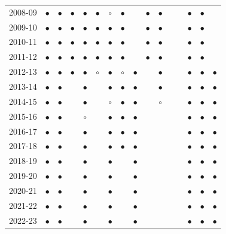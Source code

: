 \begin{table}[htbp]
\begin{tabular}{lccccccccccccccc}
2008-09 & $\bullet$ & $\bullet$ & $\bullet$ & $\bullet$ & $\bullet$ & $\circ$ & $\bullet$ &  & $\bullet$ & $\bullet$ &  &  & $\bullet$ & $\bullet$ &  \\
2009-10 & $\bullet$ & $\bullet$ & $\bullet$ & $\bullet$ & $\bullet$ & $\bullet$ & $\bullet$ &  & $\bullet$ & $\bullet$ &  &  & $\bullet$ & $\bullet$ &  \\
2010-11 & $\bullet$ & $\bullet$ & $\bullet$ & $\bullet$ & $\bullet$ & $\bullet$ & $\bullet$ &  & $\bullet$ & $\bullet$ &  &  & $\bullet$ & $\bullet$ &  \\
2011-12 & $\bullet$ & $\bullet$ & $\bullet$ & $\bullet$ & $\bullet$ & $\bullet$ & $\bullet$ &  & $\bullet$ & $\bullet$ &  &  & $\bullet$ & $\bullet$ &  \\
2012-13 & $\bullet$ & $\bullet$ & $\bullet$ & $\bullet$ & $\circ$ & $\bullet$ & $\circ$ & $\bullet$ &  & $\bullet$ &  &  & $\bullet$ & $\bullet$ & $\bullet$ \\
2013-14 & $\bullet$ & $\bullet$ &  & $\bullet$ &  & $\bullet$ & $\bullet$ & $\bullet$ &  & $\bullet$ &  &  & $\bullet$ & $\bullet$ & $\bullet$ \\
2014-15 & $\bullet$ & $\bullet$ &  & $\bullet$ &  & $\circ$ & $\bullet$ & $\bullet$ &  & $\circ$ &  &  & $\bullet$ & $\bullet$ & $\bullet$ \\
2015-16 & $\bullet$ & $\bullet$ &  & $\circ$ &  & $\bullet$ & $\bullet$ & $\bullet$ &  &  &  &  & $\bullet$ & $\bullet$ & $\bullet$ \\
2016-17 & $\bullet$ & $\bullet$ &  & $\bullet$ &  & $\bullet$ & $\bullet$ & $\bullet$ &  &  &  &  & $\bullet$ & $\bullet$ & $\bullet$ \\
2017-18 & $\bullet$ & $\bullet$ &  & $\bullet$ &  & $\bullet$ & $\bullet$ & $\bullet$ &  &  &  &  & $\bullet$ & $\bullet$ & $\bullet$ \\
2018-19 & $\bullet$ & $\bullet$ &  & $\bullet$ &  & $\bullet$ &  & $\bullet$ &  &  &  &  & $\bullet$ & $\bullet$ & $\bullet$ \\
2019-20 & $\bullet$ & $\bullet$ &  & $\bullet$ &  & $\bullet$ &  & $\bullet$ &  &  &  &  & $\bullet$ & $\bullet$ & $\bullet$ \\
2020-21 & $\bullet$ & $\bullet$ &  & $\bullet$ &  & $\bullet$ &  & $\bullet$ &  &  &  &  & $\bullet$ & $\bullet$ & $\bullet$ \\
2021-22 & $\bullet$ & $\bullet$ &  & $\bullet$ &  & $\bullet$ &  & $\bullet$ &  &  &  &  & $\bullet$ & $\bullet$ & $\bullet$ \\
2022-23 & $\bullet$ & $\bullet$ &  & $\bullet$ &  & $\bullet$ &  & $\bullet$ &  &  &  &  & $\bullet$ & $\bullet$ & $\bullet$ \\
\bottomrule
\end{tabular}


\end{table}
